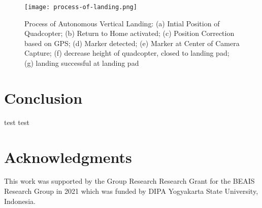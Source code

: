 \documentclass[a4paper]{jpconf}
\begin{document}
\begin{figure}[h]
    \centering
    \texttt{[image: process-of-landing.png]}
    \caption{\label{label}Process of Autonomous Vertical Landing: (a) Intial Position of Quadcopter; (b) Return to Home activated; (c) Position Correction based on GPS; (d) Marker detected; (e) Marker at Center of Camera Capture; (f) decrease height of quadcopter, closed to landing pad; (g) landing successful at landing pad}
\end{figure}

\section{Conclusion}
test test

\section*{Acknowledgments}
This work was supported by the Group Research Research Grant for the BEAIS Research Group in 2021 which was funded by DIPA Yogyakarta State University, Indonesia.
\end{document}
